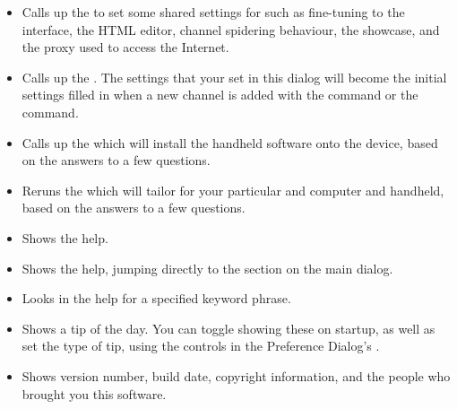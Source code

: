 \begin{itemize}
  \item {} Calls up the
  \helpignore{\ref{sec:pd-preferences-dialog}}
  to set some shared settings for \brandingapplicationdesktopname such as fine-tuning to the 
  interface, the HTML editor, channel spidering behaviour, the \brandingapplicationsuitename 
  showcase, and the proxy used to access the Internet.
  
  \item {} 
  Calls up the 
  \helpignore{\ref{sec:pd-channel-dialog}} 
  .
  The settings that your set in this dialog will become the initial settings
  filled in when a new channel is added with the 
   command or the 
   command.

  \item {} Calls up the 
  \helpignore{\ref{sec:pd-install-wizard}}
  which will install the handheld software onto the device, based on the
  answers to a few questions. 
  
  \item {} Reruns the  
  \helpignore{\ref{sec:pd-setup-wizard}}
  which will tailor \brandingapplicationsuitename for your particular and computer and handheld,
  based on the  answers to a few questions. 
\end{itemize}

\begin{itemize}
  \item {} Shows the \brandingapplicationdesktopname
  help.
  
  \item {} Shows the 
  \brandingapplicationdesktopname help, jumping directly to the 
  section on the main dialog.

  \item {} Looks in the help for a 
  specified keyword phrase.
  
  \item {} Shows a tip of the day. You 
  can toggle showing these on startup, as well as set the type of tip, using 
  the controls in the {Preference Dialog's} 
  \helpignore{\ref{sec:pd-preferences-dialog-interface-tab}}
  .
  
  \item {} Shows version number,
  build date, copyright information, and the people who brought you this 
  software.
  
\end{itemize}

